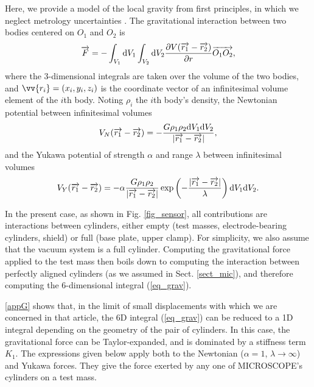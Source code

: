 \documentclass[12pt]{iopart}
\begin{document}
Here, we provide a model of the local gravity from first principles, in which we neglect metrology uncertainties \cite{liorzou20}.
The gravitational interaction between two bodies centered on $O_1$ and $O_2$ is
\begin{equation} \label{eq_grav}
\overrightarrow{F}=-\int_{V_1}{\rm d}V_1 \int_{V_2}{\rm d}V_2 \frac{\partial V(\overrightarrow{r_1}-\overrightarrow{r_2})}{\partial r} \overrightarrow{O_1O_2},
\end{equation}
where the 3-dimensional integrals are taken over the volume of the two bodies, and $\vv{r_i} = (x_i,y_i,z_i)$ is the coordinate vector of an infinitesimal volume element of the $i$th body. 
Noting $\rho_i$ the $i$th body's density, the Newtonian potential between infinitesimal volumes
\begin{equation}
V_N(\overrightarrow{r_1}-\overrightarrow{r_2})=-\frac{G\rho_1\rho_2{\rm d}V_1{\rm d}V_2}{|\overrightarrow{r_1}-\overrightarrow{r_2}|},
\end{equation}
and the Yukawa potential of strength $\alpha$ and range $\lambda$ between infinitesimal volumes
\begin{equation}
V_Y(\overrightarrow{r_1}-\overrightarrow{r_2})=-\alpha \frac{G\rho_1\rho_2}{|\overrightarrow{r_1}-\overrightarrow{r_2}|}\exp\left(-\frac{|\overrightarrow{r_1}-\overrightarrow{r_2}|}{\lambda}\right){\rm d}V_1{\rm d}V_2.
\end{equation}

In the present case, as shown in Fig. \ref{fig_sensor}, all contributions are interactions between cylinders, either empty (test masses, electrode-bearing cylinders, shield) or full (base plate, upper clamp). For simplicity, we also assume that the vacuum system is a full cylinder. Computing the gravitational force applied to the test mass then boils down to computing the interaction between perfectly aligned cylinders (as we assumed in Sect. \ref{sect_mic}), and therefore computing the 6-dimensional integral (\ref{eq_grav}). 


\ref{appG} shows that, in the limit of small displacements with which we are concerned in that article, the 6D integral (\ref{eq_grav}) can be reduced to a 1D integral depending on the geometry of the pair of cylinders. In this case, the gravitational force can be Taylor-expanded, and is dominated by a stiffness term $K_1$. The expressions given below apply both to the Newtonian ($\alpha=1$, $\lambda \rightarrow \infty$) and Yukawa forces. They give the force exerted by any one of MICROSCOPE's cylinders on a test mass.
\end{document}
